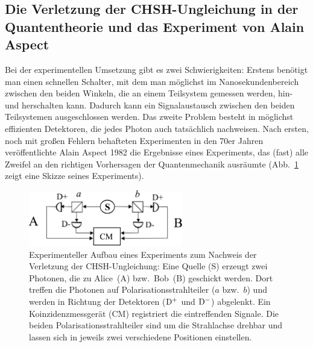 \subsection{Die Verletzung der CHSH-Ungleichung in der Quantentheorie und das Experiment von Alain Aspect}

Bei der experimentellen Umsetzung 
gibt es zwei Schwierigkeiten: Erstens be\-n\"otigt
man einen schnellen Schalter, mit dem man 
m\"oglichst im Nanosekundenbereich zwischen den beiden
Winkeln, die an einem Teilsystem gemessen werden,
hin- und herschalten kann. Dadurch kann
ein Signalaustausch zwischen den beiden Teilsystemen
ausgeschlossen werden. Das zweite Problem besteht
in m\"oglichst effizienten Detektoren, die jedes Photon
auch tats\"achlich nachweisen. Nach ersten, noch mit gro\ss en Fehlern 
behafteten Experimenten in den 70er Jahren ver\"offentlichte
Alain Aspect 
\cite{Aspect} 1982 die Ergebnisse eines
Experiments, das (fast) alle Zweifel
an den richtigen Vorhersagen der Quantenmechanik
ausr\"aumte (Abb.\ \ref{fig_Bell} zeigt eine Skizze seines Experiments). 

\begin{figure}[hbt]
\includegraphics[width=0.6\textwidth, trim = 0 0 0 0]{./Bilder/Bell.png}
\caption{\label{fig_Bell}%
Experimenteller Aufbau eines Experiments zum Nachweis der Verletzung
der CHSH-Ungleichung: Eine Quelle (S) erzeugt zwei Photonen, die zu
\glq Alice\grq\ (A) bzw.\ \glq Bob\grq\ (B) geschickt werden.
Dort treffen die Photonen auf Polarisationsstrahlteiler ($a$ bzw.\ $b$) und werden
in Richtung der Detektoren (${\rm D}^+$ und ${\rm D}^-$) abgelenkt. 
Ein Koinzidenzmessger\"at (CM) registriert die eintreffenden Signale. Die beiden
Polarisationsstrahlteiler sind um die Strahlachse drehbar und lassen sich in jeweils
zwei verschiedene Positionen einstellen.}
\end{figure}

